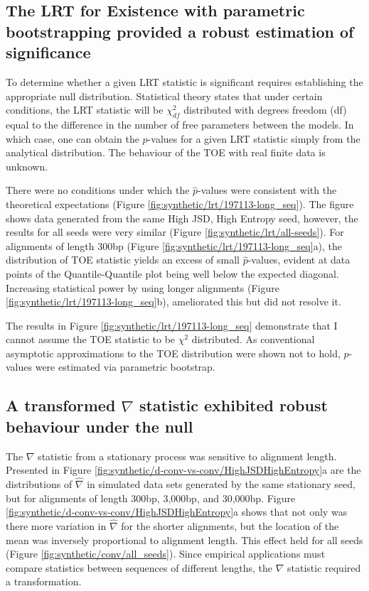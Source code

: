 \subsection{The LRT for Existence with parametric bootstrapping provided a robust estimation of significance}
\label{TOE_results}

To determine whether a given LRT statistic is significant requires establishing the appropriate null distribution. Statistical theory states that under certain conditions, the LRT statistic will be $\chi^2_{df}$ distributed with degrees freedom (df) equal to the difference in the number of free parameters between the models. In which case, one can obtain the $p$-values for a given LRT statistic simply from the analytical distribution. The behaviour of the TOE with real finite data is unknown. 

There were no conditions under which the $\hat p$-values were consistent with the theoretical expectations (Figure \ref{fig:synthetic/lrt/197113-long_seq}). The figure shows data generated from the same High JSD, High Entropy seed, however, the results for all seeds were very similar (Figure \ref{fig:synthetic/lrt/all-seeds}). For alignments of length 300bp (Figure \ref{fig:synthetic/lrt/197113-long_seq}a), the distribution of TOE statistic yields an excess of small $\hat p$-values, evident at data points of the Quantile-Quantile plot being well below the expected diagonal. Increasing statistical power by using longer alignments (Figure \ref{fig:synthetic/lrt/197113-long_seq}b), ameliorated this but did not resolve it.  



The results in Figure \ref{fig:synthetic/lrt/197113-long_seq} demonstrate that I cannot assume the TOE statistic to be $\chi^{2}$ distributed. As conventional asymptotic approximations to the TOE distribution were shown not to hold, $\hat p$-values were estimated via parametric bootstrap. 

\subsection{A transformed $\nabla$ statistic exhibited robust behaviour under the null}
\label{nabla_results}



The $\nabla$ statistic from a stationary process was sensitive to alignment length. Presented in Figure \ref{fig:synthetic/d-conv-vs-conv/HighJSDHighEntropy}a are the distributions of $\hat \nabla$ in simulated data sets generated by the same stationary seed, but for alignments of length 300bp, 3,000bp, and 30,000bp. Figure \ref{fig:synthetic/d-conv-vs-conv/HighJSDHighEntropy}a shows that not only was there more variation in $\hat \nabla$ for the shorter alignments, but the location of the mean was inversely proportional to alignment length. This effect held for all seeds (Figure \ref{fig:synthetic/conv/all_seeds}). Since empirical applications must compare statistics between sequences of different lengths, the $\nabla$ statistic required a transformation. 

